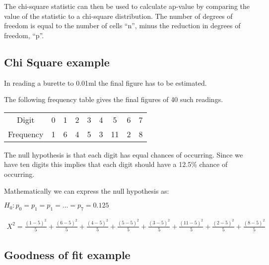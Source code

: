  

The chi-square statistic can then be used to calculate ap-value by comparing the value of the statistic to a chi-square distribution. The number of degrees of freedom is equal to the number of cells ``n'', minus the reduction in degrees of freedom, ``p''.

\subsection{Chi Square example}

In reading a burette to 0.01ml the final figure has to be estimated.

The following frequency table gives the final figures of 40 such readings.

 

\begin{tabular}{|c|c|c|c|c|c|c|c|c|}

\hline

Digit & 0 & 1 & 2 & 3 & 4 & 5 & 6 & 7 \\

Frequency& 1 & 6 & 4 & 5 & 3 & 11 & 2 & 8 \\

\hline

\end{tabular}

 

The null hypothesis is that each digit has equal chances of occurring. Since we have ten digits this implies that each digit should have a 12.5\% chance of occurring.

 

Mathematically we can express the null hypothesis as:

 

$H_{0}: p_{0} = p_{1} = p_{1}= \dots = p_{7} = 0.125$

 

\begin{eqnarray}

X^2

=\frac{(1 - 5)^2}{5} + \frac{(6 - 5)^2}{5} +\frac{(4 - 5)^2}{5} + \frac{(5 - 5)^2}{5}

 + \frac{(3 - 5)^2}{5}+ \frac{(11 - 5)^2}{5}+ \frac{(2 - 5)^2}{5}+

 \frac{(8 - 5)^2}{5}

\end{eqnarray}

 



\subsection{ Goodness of fit example}

